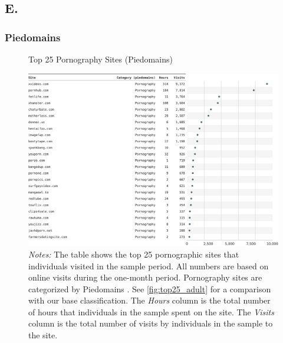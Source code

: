 \documentclass[12pt,twoside]{article}
\begin{document}
\setcounter{table}{0}
\setcounter{figure}{0}
\setcounter{equation}{0}
\FloatBarrier
\renewcommand{\thetable}{E\arabic{table}}
\renewcommand{\thefigure}{E\arabic{figure}}
\renewcommand{\theequation}{E\arabic{equation}}
\subsection{E. \smETitle{}}\label{sm:smE}
\subsubsection{Piedomains}
\begin{figure}[ht]
	\centering
	\caption{Top 25 Pornography Sites (Piedomains)}
	\includegraphics[width=\textwidth]{figs/top_25_adultsites_piedomains.pdf}
	\caption*{\footnotesize \emph{Notes:} 
		The table shows the top 25 pornographic sites that individuals visited in the sample period.
            All numbers are based on online visits during the one-month period.
		Pornography sites are categorized by Piedomains \citep{Chintalapati_piedomains_Predict_the_2022}.
            See \cref{fig:top25_adult} for a comparison with our base classification.
    	The \emph{Hours} column is the total number of hours that individuals in the sample spent on the site. 
    	The \emph{Visits} column is the total number of visits by individuals in the sample to the site.            
	}
	\label{fig:top25_adult_piedomains}
\end{figure}
\end{document}
